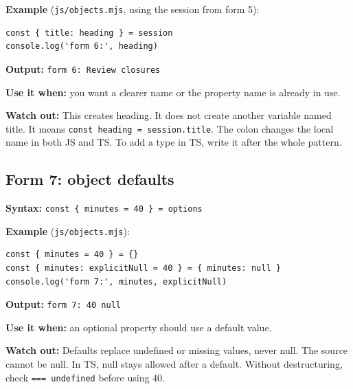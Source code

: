 \documentclass[
  10pt,
  a4paper,
]{article}
\begin{document}
\textbf{Example} (\texttt{js/\allowbreak{}objects.\allowbreak{}mjs},
using the session from form 5):

\begin{minipage}{\linewidth}

\begin{lstlisting}
const { title: heading } = session
console.log('form 6:', heading)
\end{lstlisting}

\end{minipage}\par

\textbf{Output:} \texttt{form 6:\allowbreak{} Review closures}

\textbf{Use it when:} you want a clearer name or the property name is
already in use.

\textbf{Watch out:} This creates heading. It does not create another
variable named title. It means
\texttt{const heading = session.\allowbreak{}title}. The colon changes
the local name in both JS and TS. To add a type in TS, write it after
the whole pattern.

\subsection{Form 7: object defaults}\label{form-7-object-defaults}

\textbf{Syntax:} \texttt{const \{ minutes = 40 \} = options}

\textbf{Example} (\texttt{js/\allowbreak{}objects.\allowbreak{}mjs}):

\begin{minipage}{\linewidth}

\begin{lstlisting}
const { minutes = 40 } = {}
const { minutes: explicitNull = 40 } = { minutes: null }
console.log('form 7:', minutes, explicitNull)
\end{lstlisting}

\end{minipage}\par

\textbf{Output:} \texttt{form 7:\allowbreak{} 40 null}

\textbf{Use it when:} an optional property should use a default value.

\textbf{Watch out:} Defaults replace undefined or missing values, never
null. The source cannot be null. In TS, null stays allowed after a
default. Without destructuring, check \texttt{=== undefined} before
using 40.
\end{document}
